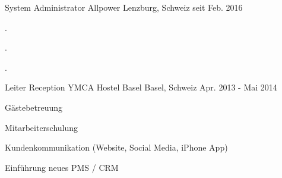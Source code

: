 \begin{cventries}
  \cventry
    {System Administrator}
    {Allpower}
    {Lenzburg, Schweiz}
    {seit Feb. 2016}
    {
      \begin{cvitems}
        \item {.}
        \item {.}
        \item {.}
      \end{cvitems}
    }
  \cventry
    {Leiter Reception}
    {YMCA Hostel Basel}
    {Basel, Schweiz}
    {Apr. 2013 - Mai 2014}
    {
      \begin{cvitems}
        \item {Gästebetreuung}
        \item {Mitarbeiterschulung}
        \item {Kundenkommunikation (Website, Social Media, iPhone App)}
        \item {Einführung neues PMS / CRM}
      \end{cvitems}
    }
\end{cventries}
